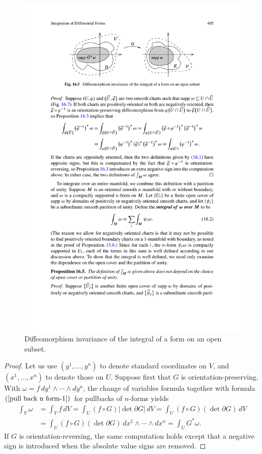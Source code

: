 \begin{figure}[htbp]
\centering
\includegraphics{pictures/int-form-Rn}
\caption{Diffeomorphism invariance of the integral of a form on an open subset.}
\end{figure}
\begin{proof}
Let us use $(y^1,\dots,y^n)$ to denote standard coordinates on $V$, and $(x^1,\dots,x^n)$ to denote those on $U$. Suppose first that $G$ is orientation-preserving. With $\omega=f\,dy^1\wedge\cdots\wedge dy^n$, the change of variables formula together with formula $(\ref{pull back n form-1})$ for pullbacks of $n$-forms yields
\begin{align*}
\int_V\omega&=\int_Vf\,dV=\int_U(f\circ G)|\det\partial G|\,dV=\int_U(f\circ G)(\det\partial G)\,dV\\
&=\int_U(f\circ G)(\det \partial G)\,dx^1\wedge\cdots\wedge dx^n=\int_UG^*\omega.
\end{align*}
If $G$ is orientation-reversing, the same computation holds except that a negative sign is introduced when the absolute value signs are removed.
\end{proof}
